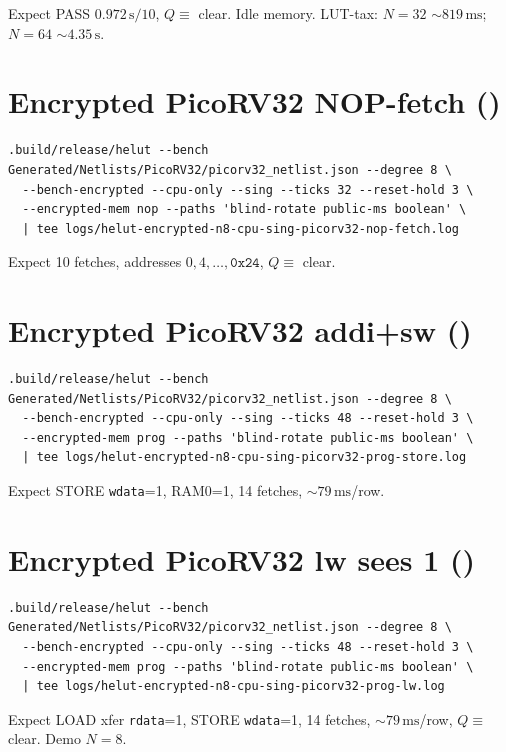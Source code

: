 Expect PASS $0.972\,\mathrm{s}/10$, $Q\equiv$ clear. Idle memory.
LUT-tax: $N{=}32$ ${\sim}819\,\mathrm{ms}$; $N{=}64$ ${\sim}4.35\,\mathrm{s}$.

\section{Encrypted PicoRV32 NOP-fetch ()}

\begin{lstlisting}
.build/release/helut --bench Generated/Netlists/PicoRV32/picorv32_netlist.json --degree 8 \
  --bench-encrypted --cpu-only --sing --ticks 32 --reset-hold 3 \
  --encrypted-mem nop --paths 'blind-rotate public-ms boolean' \
  | tee logs/helut-encrypted-n8-cpu-sing-picorv32-nop-fetch.log
\end{lstlisting}

Expect 10 fetches, addresses $0,4,\ldots,\mathtt{0x24}$, $Q\equiv$ clear.

\section{Encrypted PicoRV32 addi+sw ()}

\begin{lstlisting}
.build/release/helut --bench Generated/Netlists/PicoRV32/picorv32_netlist.json --degree 8 \
  --bench-encrypted --cpu-only --sing --ticks 48 --reset-hold 3 \
  --encrypted-mem prog --paths 'blind-rotate public-ms boolean' \
  | tee logs/helut-encrypted-n8-cpu-sing-picorv32-prog-store.log
\end{lstlisting}

Expect STORE \texttt{wdata}=1, RAM0=1, 14 fetches, ${\sim}79\,\mathrm{ms}$/row.

\section{Encrypted PicoRV32 lw sees 1 (\cid{50})}

\begin{lstlisting}
.build/release/helut --bench Generated/Netlists/PicoRV32/picorv32_netlist.json --degree 8 \
  --bench-encrypted --cpu-only --sing --ticks 48 --reset-hold 3 \
  --encrypted-mem prog --paths 'blind-rotate public-ms boolean' \
  | tee logs/helut-encrypted-n8-cpu-sing-picorv32-prog-lw.log
\end{lstlisting}

Expect LOAD xfer \texttt{rdata}=1, STORE \texttt{wdata}=1, 14 fetches,
${\sim}79\,\mathrm{ms}$/row, $Q\equiv$ clear. Demo $N{=}8$.

